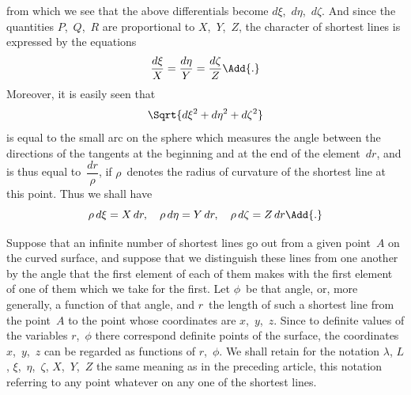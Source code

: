from which we see that the above differentials become $d\xi$,~$d\eta$,~$d\zeta$. And since the
quantities $P$,~$Q$,~$R$ are proportional to $X$,~$Y$,~$Z$, the character of shortest lines is
expressed by the equations
\[
\frac{d\xi}{X} = \frac{d\eta}{Y} = \frac{d\zeta}{Z}\Add{.}
\]
Moreover, it is easily seen that
\[
\Sqrt{d\xi^{2} + d\eta^{2} + d\zeta^{2}}
\]
is equal to the small arc on the sphere which measures the angle between the directions
of the tangents at the beginning and at the end of the element~$dr$, and is thus
equal to~$\dfrac{dr}{\rho}$, if $\rho$~denotes the radius of curvature of the shortest line at this point.
Thus we shall have
\[
\rho\, d\xi = X\, dr,\quad
\rho\, d\eta = Y\, dr,\quad
\rho\, d\zeta = Z\, dr\Add{.}
\]



Suppose that an infinite number of shortest lines go out from a given point~$A$
on the curved surface, and suppose that we distinguish these lines from one another
by the angle that the first element of each of them makes with the first element of
one of them which we take for the first. Let $\phi$~be that angle, or, more generally, a
function of that angle, and $r$~the length of such a shortest line from the point~$A$ to
the point whose coordinates are $x$,~$y$,~$z$. Since to definite values of the variables $r$,~$\phi$
there correspond definite points of the surface, the coordinates $x$,~$y$,~$z$ can be regarded
as functions of $r$,~$\phi$. We shall retain for the notation $\lambda$, $L$, $\xi$,~$\eta$,~$\zeta$, $X$,~$Y$,~$Z$ the same
meaning as in the preceding article, this notation referring to any point whatever on
any one of the shortest lines.

